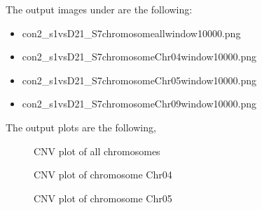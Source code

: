 \documentclass[letterpaper,10pt,english]{sphinxhowto}
\begin{document}
\sphinxAtStartPar
The output images under  are the following:
\begin{itemize}
\item {} 
\sphinxAtStartPar
con\sphinxhyphen{}2\_s1\sphinxhyphen{}vs\sphinxhyphen{}D2\sphinxhyphen{}1\_S7\sphinxhyphen{}chromosome\sphinxhyphen{}all\sphinxhyphen{}window\sphinxhyphen{}10000.png

\item {} 
\sphinxAtStartPar
con\sphinxhyphen{}2\_s1\sphinxhyphen{}vs\sphinxhyphen{}D2\sphinxhyphen{}1\_S7\sphinxhyphen{}chromosome\sphinxhyphen{}Chr04\sphinxhyphen{}window\sphinxhyphen{}10000.png

\item {} 
\sphinxAtStartPar
con\sphinxhyphen{}2\_s1\sphinxhyphen{}vs\sphinxhyphen{}D2\sphinxhyphen{}1\_S7\sphinxhyphen{}chromosome\sphinxhyphen{}Chr05\sphinxhyphen{}window\sphinxhyphen{}10000.png

\item {} 
\sphinxAtStartPar
con\sphinxhyphen{}2\_s1\sphinxhyphen{}vs\sphinxhyphen{}D2\sphinxhyphen{}1\_S7\sphinxhyphen{}chromosome\sphinxhyphen{}Chr09\sphinxhyphen{}window\sphinxhyphen{}10000.png

\end{itemize}

\sphinxAtStartPar
The output plots are the following,

\begin{figure}[htbp]
\centering
\capstart

\noindent{}
\caption{CNV plot of all chromosomes}\label{\detokenize{index:id3}}\end{figure}

\begin{figure}[htbp]
\centering
\capstart

\noindent{}
\caption{CNV plot of chromosome Chr04}\label{\detokenize{index:id4}}\end{figure}

\begin{figure}[htbp]
\centering
\capstart

\noindent{}
\caption{CNV plot of chromosome Chr05}\label{\detokenize{index:id5}}\end{figure}
\end{document}

